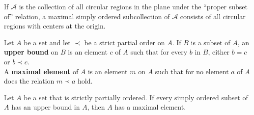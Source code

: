 \begin{eg}
If $\mathscr{A}$ is the collection of all circular regions in the plane under the ``proper subset of'' relation, a maximal simply
ordered subcollection of $\mathscr{A}$ consists of all circular regions with centers at the origin.
\end{eg}

\begin{definition}
Let $A$ be a set and let $\prec$ be a strict partial order on $A$. If $B$ is a subset of $A$, an 
\textbf{upper bound} on $B$ is an element $c$ of $A$ such that for every $b$ in $B$, either $b = c$ or $b \prec c$. \\

A \textbf{maximal element} of $A$ is an element $m$ on $A$ such that for no element $a$ of $A$ does the relation $m \prec a$ hold. 
\end{definition}

\begin{theorem}
Let $A$ be a set that is strictly partially ordered. If every simply ordered subset of $A$ has an upper bound in $A$, then $A$ has a maximal element.
\end{theorem}